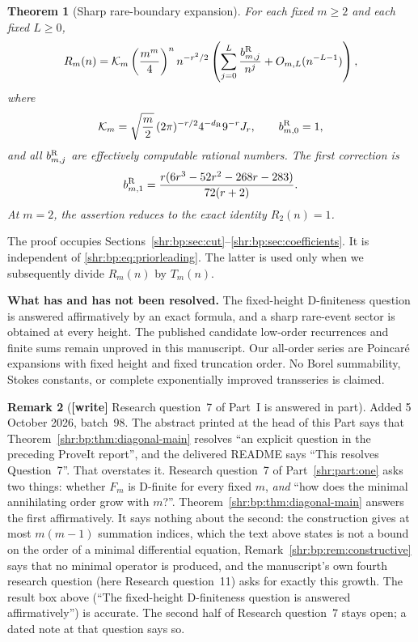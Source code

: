 \documentclass[11pt,letterpaper]{article}
\numberwithin{equation}{section}
\newtheorem{theorem}{Theorem}[section]
\theoremstyle{definition}
\newtheorem{remark}[theorem]{Remark}
\newcommand{\1}{\mathbf 1}
\begin{document}
\begin{theorem}[Sharp rare-boundary expansion]
\label{shr:bp:thm:rare-main}
For each fixed $m\ge2$ and each fixed $L\ge0$,
\begin{equation}
 R_m(n)=\mathcal K_m\left(\frac{m^m}{4}\right)^n n^{-r^2/2}
 \left(\sum_{j=0}^{L}\frac{b_{m,j}^{\rm R}}{n^j}
       +O_{m,L}(n^{-L-1})\right),
 \label{shr:bp:eq:rareall}
\end{equation}
where
\begin{equation}
 \mathcal K_m=
 \sqrt{\frac m2}\,(2\pi)^{-r/2}4^{-d_{\rm R}}9^{-r}J_r,
 \qquad b_{m,0}^{\rm R}=1,
 \label{shr:bp:eq:rareK}
\end{equation}
and all $b_{m,j}^{\rm R}$ are effectively computable rational numbers.
The first correction is
\begin{equation}
 b_{m,1}^{\rm R}
 =\frac{r(6r^3-52r^2-268r-283)}{72(r+2)}.
 \label{shr:bp:eq:rare-b1}
\end{equation}
At $m=2$, the assertion reduces to the exact identity $R_2(n)=1$.
\end{theorem}

The proof occupies Sections~\ref{shr:bp:sec:cut}--\ref{shr:bp:sec:coefficients}.
It is independent of \eqref{shr:bp:eq:priorleading}. The latter is used only when
we subsequently divide $R_m(n)$ by $T_m(n)$.

\begin{resultbox}
\textbf{What has and has not been resolved.}
The fixed-height D-finiteness question is answered affirmatively by an
exact formula, and a sharp rare-event sector is obtained at every height.
The published candidate low-order recurrences and finite sums remain
unproved in this manuscript. Our all-order series are Poincar\'e expansions
with fixed height and fixed truncation order. No Borel summability,
Stokes constants, or complete exponentially improved transseries is claimed.
\end{resultbox}

\begin{remark}[\textbf{[write]} Research question~7 of Part~I is answered in part]
\label{shr:bp:rem:q7}
Added 5 October 2026, batch~98. The abstract printed at the head of this
Part says that Theorem~\ref{shr:bp:thm:diagonal-main} resolves ``an
explicit question in the preceding ProveIt report'', and the delivered
README says ``This resolves Question~7''. That overstates it. Research
question~7 of Part~\ref{shr:part:one} asks two things: whether $F_m$ is
D-finite for every fixed $m$, \emph{and} ``how does the minimal annihilating
order grow with $m$?''. Theorem~\ref{shr:bp:thm:diagonal-main} answers the
first affirmatively. It says nothing about the second: the construction
gives at most $m(m-1)$ summation indices, which the text above states is
not a bound on the order of a minimal differential equation,
Remark~\ref{shr:bp:rem:constructive} says that no minimal operator is
produced, and the manuscript's own fourth research question (here Research
question~11) asks for exactly this growth. The result box above (``The
fixed-height D-finiteness question is answered affirmatively'') is
accurate. The second half of Research question~7 stays open; a dated note
at that question says so.
\end{remark}
\end{document}

